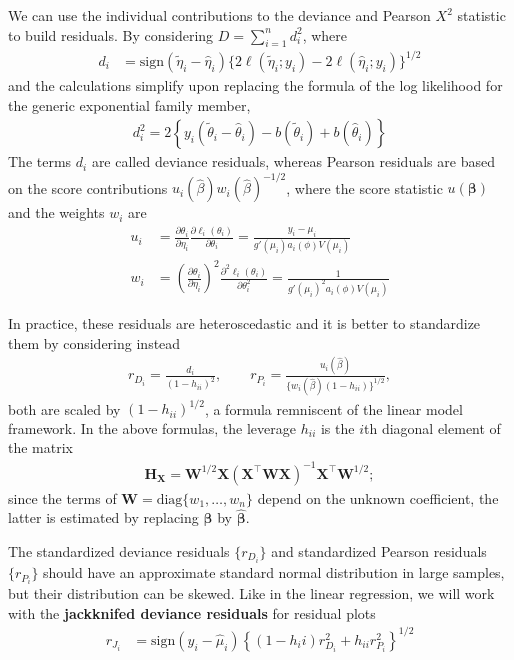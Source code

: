 \documentclass[
  11pt,
  letterpaper,
]{book}
\theoremstyle{definition}
\theoremstyle{definition}
\theoremstyle{definition}
\theoremstyle{remark}
\begin{document}
We can use the individual contributions to the deviance and Pearson \(X^2\) statistic to build residuals. By considering \(D = \sum_{i=1}^n d_i^2\), where
\begin{align*}
d_i &= \mathrm{sign}(\widetilde{\eta}_i - \widehat{\eta}_i) \{2\ell(\widetilde{\eta}_i; y_i) - 2\ell(\widehat{\eta}_i; y_i)\}^{1/2}
\end{align*} and the calculations simplify upon replacing the formula of the log likelihood for the generic exponential family member,
\begin{align*}
d_i^2=2 \left\{y_i (\widetilde{\theta}_i - \widehat{\theta}_i) - b(\widetilde{\theta}_i) + b(\widehat{\theta}_i)\right\}
\end{align*}
The terms \(d_i\) are called deviance residuals, whereas Pearson residuals are based on the score contributions \(u_i(\widehat{\beta}) w_i(\widehat{\beta})^{-1/2}\),
where the score statistic \(u(\boldsymbol{\beta})\) and the weights \(w_i\) are
\begin{align*}
u_i &= \frac{\partial \theta_i}{\partial \eta_i} \frac{\partial \ell_i(\theta_i)}{\partial \theta_i} = \frac{y_i - \mu_i}{g'(\mu_i)a_i(\phi)V(\mu_i)}\\
w_i &= \left(\frac{\partial \theta_i}{\partial \eta_i}\right)^2 \frac{\partial^2 \ell_i(\theta_i)}{\partial \theta_i^2} = \frac{1}{g'(\mu_i)^2 a_i(\phi)V(\mu_i)}
\end{align*}

In practice, these residuals are heteroscedastic and it is better to standardize them by considering instead
\begin{align*}
r_{D_i} = \frac{d_i}{(1-h_{ii})^2}, \qquad r_{P_i} = \frac{u_i(\widehat{\beta})}{\{w_i(\widehat{\beta})(1-h_{ii})\}^{1/2}},
\end{align*}
both are scaled by \((1-h_{ii})^{1/2}\), a formula remniscent of the linear model framework. In the above formulas, the leverage \(h_{ii}\) is the \(i\)th diagonal element of the matrix
\begin{align*}
\mathbf{H}_{\mathbf{X}} = \mathbf{W}^{1/2}\mathbf{X}(\mathbf{X}^\top\mathbf{W}\mathbf{X})^{-1} \mathbf{X}^\top\mathbf{W}^{1/2};
\end{align*}
since the terms of \(\mathbf{W}=\mathrm{diag}\{w_1, \ldots, w_n\}\) depend on the unknown coefficient, the latter is estimated by replacing \(\boldsymbol{\beta}\) by \(\widehat{\boldsymbol{\beta}}\).

The standardized deviance residuals \(\{r_{D_i}\}\) and standardized Pearson residuals \(\{r_{P_i}\}\) should have an approximate standard normal distribution in large samples, but their distribution can be skewed. Like in the linear regression, we will work with the \textbf{jackknifed deviance residuals} for residual plots
\begin{align*}
r_{J_i} &= \mathrm{sign}(y_i - \widehat{\mu}_i) \left\{ (1-{h_ii})r^2_{D_i} + h_{ii}r^2_{P_i}\right\}^{1/2}
\end{align*}
\end{document}
